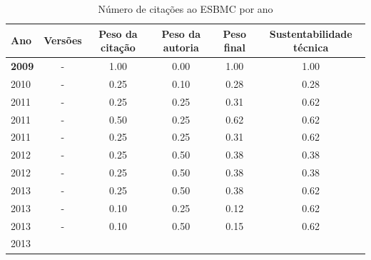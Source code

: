 \begin{table}[H]
\caption{Número de citações ao ESBMC  por ano}
\centering
\begin{tabular}{| l | c | c | c | c | c |}
  \hline
  Ano & Versões & Peso da citação & Peso da autoria & Peso final & Sustentabilidade técnica \\
  \hline
            {\bf 2009}
          &
          -
          &
          1.00
          &
          0.00
          &
          1.00
          &
            {\color{blue} 1.00}
          \\
\hline
            2010
          &
          -
          &
          0.25
          &
          0.10
          &
          0.28
          &
            {\color{red} 0.28}
          \\
\hline
            2011
          &
          -
          &
          0.25
          &
          0.25
          &
          0.31
          &
            {\color{blue} 0.62}
          \\
            2011
          &
          -
          &
          0.50
          &
          0.25
          &
          0.62
          &
            {\color{blue} 0.62}
          \\
            2011
          &
          -
          &
          0.25
          &
          0.25
          &
          0.31
          &
            {\color{blue} 0.62}
          \\
\hline
            2012
          &
          -
          &
          0.25
          &
          0.50
          &
          0.38
          &
            {\color{red} 0.38}
          \\
            2012
          &
          -
          &
          0.25
          &
          0.50
          &
          0.38
          &
            {\color{red} 0.38}
          \\
\hline
            2013
          &
          -
          &
          0.25
          &
          0.50
          &
          0.38
          &
            {\color{blue} 0.62}
          \\
            2013
          &
          -
          &
          0.10
          &
          0.25
          &
          0.12
          &
            {\color{blue} 0.62}
          \\
            2013
          &
          -
          &
          0.10
          &
          0.50
          &
          0.15
          &
            {\color{blue} 0.62}
          \\
            2013
          &

\end{tabular}
\end{table}
